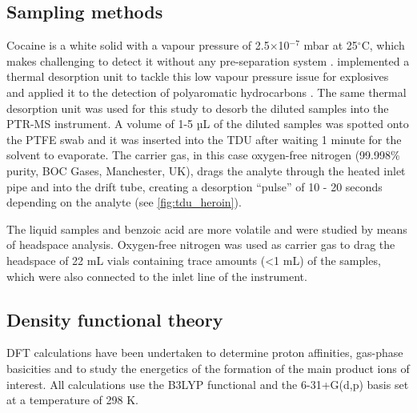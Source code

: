 \subsection{Sampling methods}%
Cocaine is a white solid with a vapour pressure of 2.5$\times$10$^{-7}$ mbar  at 25$^\circ$C, which makes challenging to detect it without any pre-separation system \cite{cocaineVP55}.
%
%
%
\citeauthor{RN445} implemented a thermal desorption unit to tackle this low vapour pressure issue for explosives and \citeauthor{blenkhorn2019novel} applied it to the detection of polyaromatic hydrocarbons \cite{RN445,blenkhorn2019novel}.
The same thermal desorption unit was used for this study to desorb the diluted samples into the PTR-MS instrument.
%
A volume of 1-5 µL of the diluted samples was spotted onto the PTFE swab and it was inserted into the TDU after waiting 1 minute for the solvent to evaporate. The carrier gas, in this case oxygen-free nitrogen (99.998\% purity, BOC Gases, Manchester, UK), drags the analyte through the heated inlet pipe and into the drift tube, creating a desorption “pulse” of 10 - 20 seconds depending on the analyte (see \autoref{fig:tdu_heroin}).


The liquid samples and benzoic acid are more volatile and were studied by means of headspace analysis. Oxygen-free nitrogen was used as carrier gas to drag the headspace of 22 mL vials containing trace amounts (<1 mL) of the samples, which were also connected to the inlet line of the instrument. 

\subsection{Density functional theory}
DFT calculations have been undertaken to determine  proton affinities,  gas-phase basicities  and to study the energetics of the formation of the main product ions of interest. All calculations use the B3LYP functional and the 6-31+G(d,p) basis set at a temperature of 298 K.


